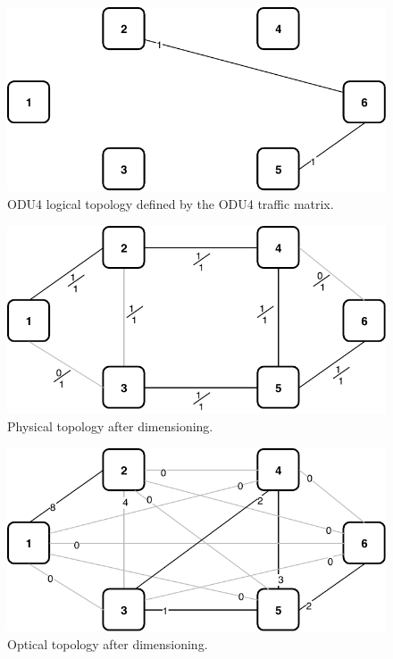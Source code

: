 \begin{figure}[h!]
\centering
\includegraphics[width=12cm]{sdf/ilp/translucent_survivability/figures/logical_topology_ODU4_low}
\caption{ODU4 logical topology defined by the ODU4 traffic matrix.}
\label{logical3_ODU4_low}
\end{figure}
\newpage
\begin{figure}[h!]
\centering
\includegraphics[width=12cm]{sdf/ilp/translucent_survivability/figures/physical_topology_low}
\caption{Physical topology after dimensioning.}
\label{physical3_low}
\end{figure}

\begin{figure}[h!]
\centering
\includegraphics[width=12cm]{sdf/ilp/translucent_survivability/figures/optical_topology_low}
\caption{Optical topology after dimensioning.}
\label{optical3_low}
\end{figure}

